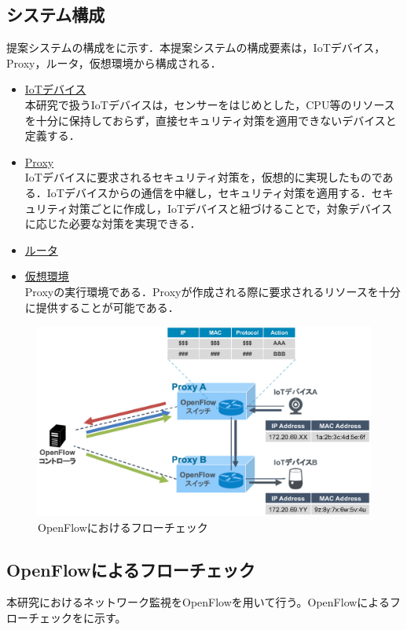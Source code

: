 \documentclass[Japanese]{dicomopapers}
\begin{document}
\subsection{システム構成}
提案システムの構成をに示す．本提案システムの構成要素は，IoTデバイス，Proxy，ルータ，仮想環境から構成される．
\begin{itemize}
	\item \underline{IoTデバイス}\mbox{}\\
	      本研究で扱うIoTデバイスは，センサーをはじめとした，CPU等のリソースを十分に保持しておらず，直接セキュリティ対策を適用できないデバイスと定義する．
	\item \underline{Proxy}\mbox{}\\
	      IoTデバイスに要求されるセキュリティ対策を，仮想的に実現したものである．IoTデバイスからの通信を中継し，セキュリティ対策を適用する．セキュリティ対策ごとに作成し，IoTデバイスと紐づけることで，対象デバイスに応じた必要な対策を実現できる．
	\item \underline{ルータ}\mbox{}\\
	\item \underline{仮想環境}\mbox{}\\
	      Proxyの実行環境である．Proxyが作成される際に要求されるリソースを十分に提供することが可能である．
\end{itemize}

\begin{figure}[!tb]
	\centering
	\includegraphics[width=\linewidth]{img/openflow.eps}
	\caption{OpenFlowにおけるフローチェック}
	\label{fig:openflow}
\end{figure}

\subsection{OpenFlowによるフローチェック}
本研究におけるネットワーク監視をOpenFlowを用いて行う。OpenFlowによるフローチェックをに示す。
\end{document}
